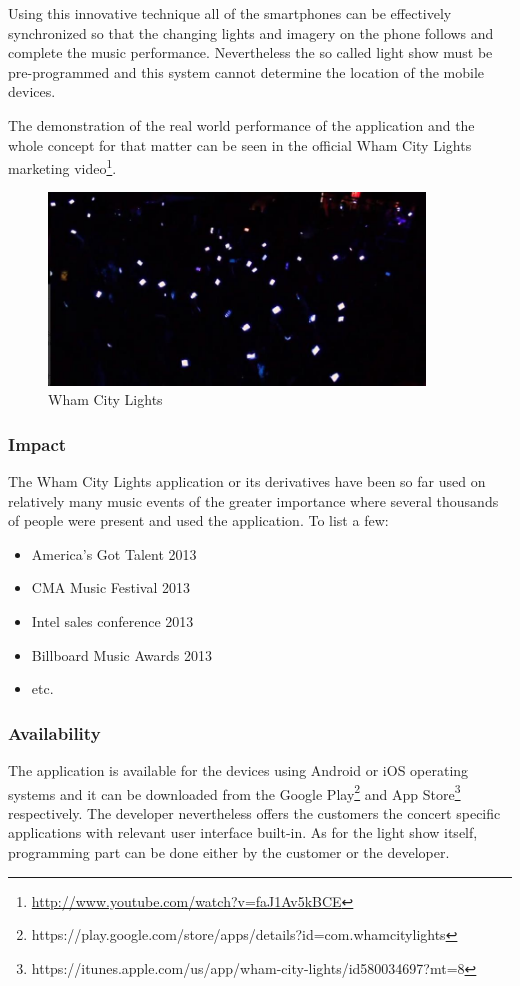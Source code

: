 Using this innovative technique all of the smartphones can be effectively synchronized so that the  changing lights and imagery on the phone follows and complete the music performance.
Nevertheless the so called light show must be pre-programmed and this system cannot determine the location of the mobile devices.

The demonstration of the real world performance of the application and the whole concept for that matter can be seen in the official Wham City Lights marketing video\footnote{\url{http://www.youtube.com/watch?v=faJ1Av5kBCE}}.

\begin{figure}[!t]
	\centering
		\includegraphics[width=10cm]{preliminaryStudies/wham_city_lights.jpg}
	\caption{Wham City Lights}
	\label{fig:wham_city_lights}
\end{figure}

\subsubsection{Impact}
The Wham City Lights application or its derivatives have been so far used on relatively many music events of the greater importance where several thousands of people were present and used the application. To list a few:
\begin{itemize}
\item America's Got Talent 2013
\item CMA Music Festival 2013
\item Intel sales conference 2013
\item Billboard Music Awards 2013
\item etc.
\end{itemize}

\subsubsection{Availability}
The application is available for the devices using Android or iOS operating systems and it can be downloaded from the Google Play\footnote{https://play.google.com/store/apps/details?id=com.whamcitylights} and App Store\footnote{https://itunes.apple.com/us/app/wham-city-lights/id580034697?mt=8} respectively. The developer nevertheless offers the customers the concert specific applications with relevant user interface built-in. As for the light show itself, programming part can be done either by the customer or the developer.

